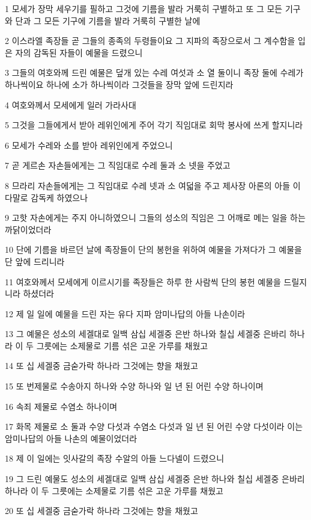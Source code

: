 \par 1 모세가 장막 세우기를 필하고 그것에 기름을 발라 거룩히 구별하고 또 그 모든 기구와 단과 그 모든 기구에 기름을 발라 거룩히 구별한 날에
\par 2 이스라엘 족장들 곧 그들의 종족의 두령들이요 그 지파의 족장으로서 그 계수함을 입은 자의 감독된 자들이 예물을 드렸으니
\par 3 그들의 여호와께 드린 예물은 덮개 있는 수레 여섯과 소 열 둘이니 족장 둘에 수레가 하나씩이요 하나에 소가 하나씩이라 그것들을 장막 앞에 드린지라
\par 4 여호와께서 모세에게 일러 가라사대
\par 5 그것을 그들에게서 받아 레위인에게 주어 각기 직임대로 회막 봉사에 쓰게 할지니라
\par 6 모세가 수레와 소를 받아 레위인에게 주었으니
\par 7 곧 게르손 자손들에게는 그 직임대로 수레 둘과 소 넷을 주었고
\par 8 므라리 자손들에게는 그 직임대로 수레 넷과 소 여덟을 주고 제사장 아론의 아들 이다말로 감독케 하였으나
\par 9 고핫 자손에게는 주지 아니하였으니 그들의 성소의 직임은 그 어깨로 메는 일을 하는 까닭이었더라
\par 10 단에 기름을 바르던 날에 족장들이 단의 봉헌을 위하여 예물을 가져다가 그 예물을 단 앞에 드리니라
\par 11 여호와께서 모세에게 이르시기를 족장들은 하루 한 사람씩 단의 봉헌 예물을 드릴지니라 하셨더라
\par 12 제 일 일에 예물을 드린 자는 유다 지파 암미나답의 아들 나손이라
\par 13 그 예물은 성소의 세겔대로 일백 삼십 세겔중 은반 하나와 칠십 세겔중 은바리 하나라 이 두 그릇에는 소제물로 기름 섞은 고운 가루를 채웠고
\par 14 또 십 세겔중 금숟가락 하나라 그것에는 향을 채웠고
\par 15 또 번제물로 수송아지 하나와 수양 하나와 일 년 된 어린 수양 하나이며
\par 16 속죄 제물로 수염소 하나이며
\par 17 화목 제물로 소 둘과 수양 다섯과 수염소 다섯과 일 년 된 어린 수양 다섯이라 이는 암미나답의 아들 나손의 예물이었더라
\par 18 제 이 일에는 잇사갈의 족장 수알의 아들 느다넬이 드렸으니
\par 19 그 드린 예물도 성소의 세겔대로 일백 삼십 세겔중 은반 하나와 칠십 세겔중 은바리 하나라 이 두 그릇에는 소제물로 기름 섞은 고운 가루를 채웠고
\par 20 또 십 세겔중 금숟가락 하나라 그것에는 향을 채웠고
